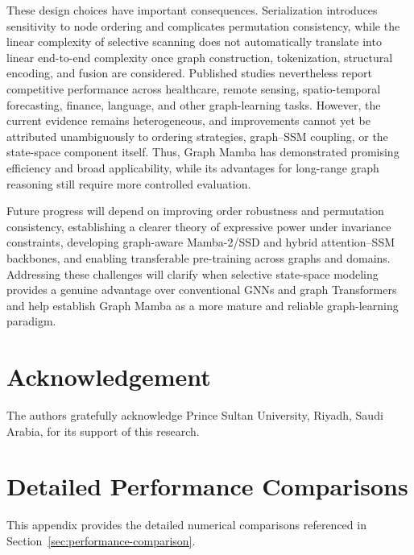 \documentclass[acmsmall]{acmart}
\begin{document}
These design choices have important consequences. Serialization introduces
sensitivity to node ordering and complicates permutation consistency, while the
linear complexity of selective scanning does not automatically translate into
linear end-to-end complexity once graph construction, tokenization, structural
encoding, and fusion are considered. Published studies nevertheless report
competitive performance across healthcare, remote sensing, spatio-temporal
forecasting, finance, language, and other graph-learning tasks. However, the
current evidence remains heterogeneous, and improvements cannot yet be
attributed unambiguously to ordering strategies, graph--SSM coupling, or the
state-space component itself. Thus, Graph Mamba has demonstrated promising
efficiency and broad applicability, while its advantages for long-range graph
reasoning still require more controlled evaluation.

Future progress will depend on improving order robustness and permutation
consistency, establishing a clearer theory of expressive power under invariance
constraints, developing graph-aware Mamba-2/SSD and hybrid attention--SSM
backbones, and enabling transferable pre-training across graphs and domains.
Addressing these challenges will clarify when selective state-space modeling
provides a genuine advantage over conventional GNNs and graph Transformers and
help establish Graph Mamba as a more mature and reliable graph-learning
paradigm.


\section*{Acknowledgement}
The authors gratefully acknowledge Prince Sultan University, Riyadh, Saudi Arabia, for its support of this research.

% 



\clearpage

\appendix

\section{Detailed Performance Comparisons}
\label{app:performance-tables}

This appendix provides the detailed numerical comparisons referenced in
Section~\ref{sec:performance-comparison}.
\end{document}
